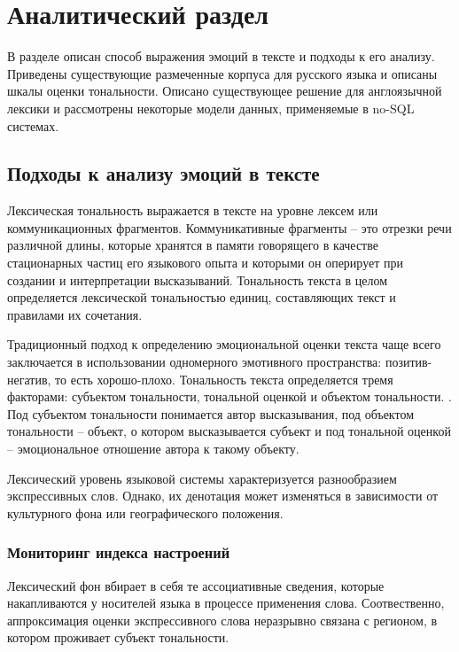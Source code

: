 \chapter{Аналитический раздел}\label{sec:analyth}
В разделе описан способ выражения эмоций в тексте и подходы к его анализу. Приведены существующие размеченные корпуса для русского языка и описаны шкалы оценки тональности. Описано существующее решение для англоязычной лексики и рассмотрены некоторые модели данных, применяемые в no-SQL системах.  
\section{Подходы к анализу эмоций в тексте}
Лексическая тональность выражается в тексте на уровне лексем или коммуникационных фрагментов. Коммуникативные фрагменты -- это отрезки речи различной длины, которые хранятся в памяти говорящего в качестве стационарных частиц его языкового опыта и которыми он оперирует при создании и интерпретации высказываний. \cite{Гаспаров1996} Тональность текста в целом определяется лексической тональностью единиц, составляющих текст и правилами их сочетания.

Традиционный подход к определению эмоциональной оценки текста чаще всего заключается в использовании одномерного эмотивного пространства: позитив-негатив, то есть хорошо-плохо. Тональность текста определяется тремя факторами: субъектом тональности, тональной оценкой и объектом тональности. \cite{Пазельская2011}. Под субъектом тональности понимается автор высказывания, под объектом тональности -- объект, о котором высказывается субъект и под тональной оценкой -- эмоциональное отношение автора к такому объекту. 

Лексический уровень языковой системы характеризуется разнообразием экспрессивных слов. Однако, их денотация может изменяться в зависимости от культурного фона или географического положения. 
\subsection{Мониторинг индекса настроений}
Лексический фон вбирает в себя те ассоциативные сведения, которые накапливаются у носителей языка в процессе применения слова. \cite{МатвееваТ.2013} Соотвественно, аппроксимация оценки экспрессивного слова неразрывно связана с регионом, в котором проживает субъект тональности. 
 
